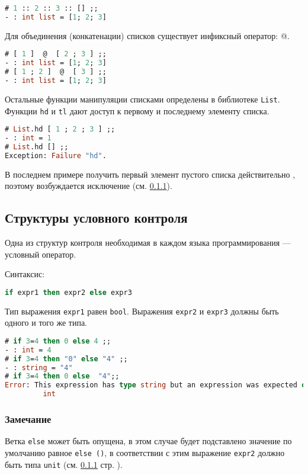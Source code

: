 \begin{lstlisting}[language=OCaml]
# 1 :: 2 :: 3 :: [] ;;
- : int list = [1; 2; 3]
\end{lstlisting}

Для объединения (конкатенации) списков существует инфиксный оператор: @.

\begin{lstlisting}[language=OCaml]
# [ 1 ]  @  [ 2 ; 3 ] ;;
- : int list = [1; 2; 3]
# [ 1 ; 2 ]  @  [ 3 ] ;;
- : int list = [1; 2; 3]
\end{lstlisting}

Остальные функции манипуляции списками определены в библиотеке \texttt{List}.
Функции \texttt{hd} и \texttt{tl} дают доступ к первому и последнему элементу
списка.

\begin{lstlisting}[language=OCaml]
# List.hd [ 1 ; 2 ; 3 ] ;;
- : int = 1
# List.hd [] ;;
Exception: Failure "hd".
\end{lstlisting}

В последнем примере получить первый элемент пустого списка действительно
, поэтому возбуждается исключение (см. \ref{}).

\subsection{Структуры условного контроля}
\label{subsec:conditional_control_structure}

Одна из структур контроля необходимая в каждом языка программирования ---
условный оператор.

Синтаксис:

\begin{lstlisting}[language=OCaml]
if expr1 then expr2 else expr3
\end{lstlisting}

Тип выражения \texttt{expr1} равен \texttt{bool}. Выражения \texttt{expr2} и
\texttt{expr3} должны быть одного и того же типа.

\begin{lstlisting}[language=OCaml]
# if 3=4 then 0 else 4 ;;
- : int = 4
# if 3=4 then "0" else "4" ;;
- : string = "4"
# if 3=4 then 0 else  "4";;
Error: This expression has type string but an expression was expected of type
         int
\end{lstlisting}

\subsubsection{Замечание}
Ветка \texttt{else} может быть опущена, в этом случае будет подставлено значение
по умолчанию равное \texttt{else ()}, в соответствии с этим выражение
\texttt{expr2} должно быть типа \texttt{unit} (см. \ref{} стр. \pageref{}).

